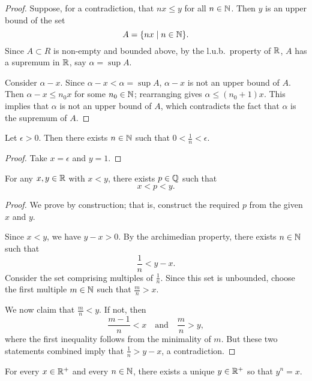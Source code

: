 \begin{proof}
Suppose, for a contradiction, that $nx\le y$ for all $n\in\mathbb N$. Then $y$ is an upper bound of the set
\[A=\{nx\mid n\in\mathbb N\}.\]
Since $A\subset R$ is non-empty and bounded above, by the l.u.b.\ property of $\RR$, $A$ has a supremum in $\RR$, say $\alpha=\sup A$.

Consider $\alpha-x$. Since $\alpha-x<\alpha=\sup A$, $\alpha-x$ is not an upper bound of $A$. Then $\alpha-x\le n_0x$ for some $n_0\in\mathbb N$; rearranging gives $\alpha\le(n_0+1)x$. This implies that $\alpha$ is not an upper bound of $A$, which contradicts the fact that $\alpha$ is the supremum of $A$.
\end{proof}

\begin{corollary}
Let $\epsilon>0$. Then there exists $n\in\mathbb N$ such that $0<\frac{1}{n}<\epsilon$.
\end{corollary}

\begin{proof}
Take $x=\epsilon$ and $y=1$.
\end{proof}

\begin{proposition}[$\QQ$ is dense in $\RR$]
For any $x,y\in\mathbb R$ with $x<y$, there exists $p\in\mathbb Q$ such that 
\[x<p<y.\]
\end{proposition}

\begin{proof}
We prove by construction; that is, construct the required $p$ from the given $x$ and $y$.

Since $x<y$, we have $y-x>0$. By the archimedian property, there exists $n\in\mathbb N$ such that
\[\frac{1}{n}<y-x.\]
Consider the set comprising multiples of $\frac{1}{n}$. Since this set is unbounded, choose the first multiple $m\in\mathbb N$ such that $\frac{m}{n}>x$.

We now claim that $\frac{m}{n}<y$. If not, then
\[\frac{m-1}{n}<x\quad\text{and}\quad\frac{m}{n}>y,\]
where the first inequality follows from the minimality of $m$. But these two statements combined imply that $\frac{1}{n}>y-x$, a contradiction.
\end{proof}

\begin{proposition}
For every $x\in\mathbb R^+$ and every $n\in\mathbb N$, there exists a unique $y\in\mathbb R^+$ so that $y^n=x$.
\end{proposition}


